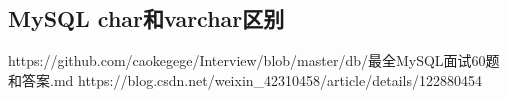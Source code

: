 \documentclass[../../../interview-questions.tex]{subfiles}
\begin{document}
\subsection{MySQL char和varchar区别}

https://github.com/caokegege/Interview/blob/master/db/最全MySQL面试60题和答案.md
https://blog.csdn.net/weixin\_42310458/article/details/122880454
\end{document}
